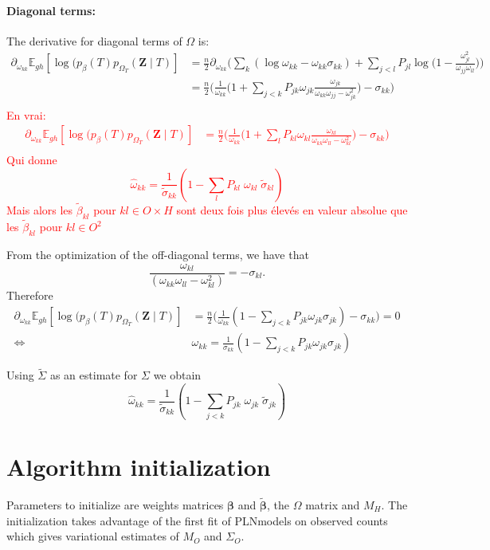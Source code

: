 \documentclass[11pt,a4paper]{article}
\newcommand{\betabf}{\boldsymbol{\beta}}
\newcommand{\Zbf}{\boldsymbol{Z}}
\newcommand{\Esp}{\mathds{E}}
\begin{document}
\paragraph{Diagonal terms:\\}
The derivative for diagonal terms of $\Omega$ is:
\begin{align*}
 \partial_{\omega_{kk}}\Esp_{gh} [\log (p_\beta(T)p_{\Omega_T}(\Zbf\mid T) ] &=\frac{n}{2} \partial_{\omega_{kk}} \Big( \sum_k (\log \omega_{kk} - \omega_{kk} \sigma_{kk} )+  \sum_{j<l} P_{jl} \log \big(1-\frac{\omega_{jl}^2}{\omega_{jj} \omega_{ll}}\big)\Big)\\
 &=\frac{n}{2} \Big( \frac{1}{\omega_{kk}} \Big( 1 + \sum_{j<k} P_{jk} \omega_{jk} \frac{\omega_{jk}}{\omega_{kk}\omega_{jj} - \omega_{jk}^2}\Big) - \sigma_{kk}\Big)\\
  \end{align*}
\textcolor{red}{En vrai:
\begin{align*}
 \partial_{\omega_{kk}}\Esp_{gh} [\log (p_\beta(T)p_{\Omega_T}(\Zbf\mid T) ] &=\frac{n}{2} \Big( \frac{1}{\omega_{kk}} \Big( 1 + \sum_{l} P_{kl} \omega_{kl} \frac{\omega_{kl}}{\omega_{kk}\omega_{ll} - \omega_{kl}^2}\Big) - \sigma_{kk}\Big)\\
  \end{align*}
  Qui donne 
  $$\hat{\omega}_{kk} = \frac{1}{\widetilde{\sigma}_{kk}} \left( 1- \sum_{l}  P_{kl} \;\omega_{kl} \;\widetilde{\sigma}_{kl}\right)$$
  Mais alors les $\widetilde{\beta}_{kl}$ pour $kl \in O\times H$ sont deux fois plus élevés en valeur absolue que les $\widetilde{\beta}_{kl}$ pour $kl \in O^2$}
  
  
From the optimization of the off-diagonal terms, we have that $$\frac{\omega_{kl}}{(\omega_{kk}\omega_{ll}-\omega_{kl}^2)}  = - {\sigma}_{kl} . $$
Therefore
 \begin{align*}
 \partial_{\omega_{kk}}\Esp_{gh} [\log (p_\beta(T)p_{\Omega_T}(\Zbf\mid T) ] 
  &=\frac{n}{2} \Big( \frac{1}{\omega_{kk}} ( 1 - \sum_{j<k} P_{jk} \omega_{jk} \sigma_{jk} ) - \sigma_{kk}\Big) = 0 \\
  \iff &  \omega_{kk}=\frac{1}{\sigma_{kk}} \left(1-\sum_{j<k} P_{jk}\omega_{jk}\sigma_{jk} \right)  
\end{align*}

Using $\widetilde{\Sigma}$ as an estimate for $\Sigma$ we obtain
$$\boxed{ \hat{\omega}_{kk} = \frac{1}{\widetilde{\sigma}_{kk}} \left( 1- \sum_{j<k}  P_{jk} \;\omega_{jk} \;\widetilde{\sigma}_{jk}\right)}$$
 
\section{Algorithm initialization}
Parameters to initialize are weights matrices $\betabf$ and $\widetilde{\betabf}$, the $\Omega$ matrix and $M_H$. The initialization takes advantage of the first fit of PLNmodels on observed counts which gives variational estimates of $M_O$ and $\Sigma_O$.
\end{document}
